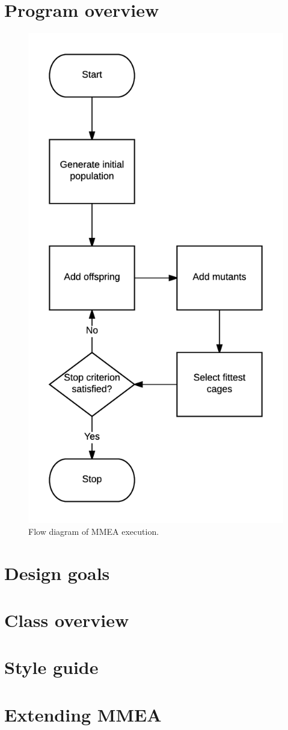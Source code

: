\documentclass[a4paper, titlepage]{article}
\begin{document}
\section{Program overview}
\begin{figure}[h]
	\centering
	\includegraphics[scale=0.25]{./figures/program_overview/MMEA_flow.png}
	\caption{Flow diagram of MMEA execution.}
	\label{flow_diagram}
\end{figure}

\section{Design goals}

\section{Class overview}

\section{Style guide}

\section{Extending MMEA}
\end{document}

